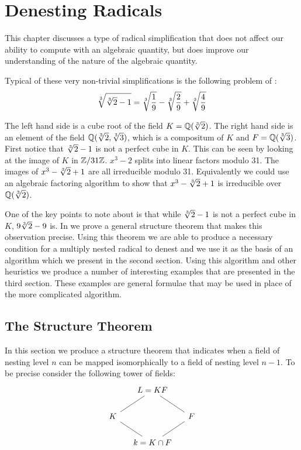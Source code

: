 \chapter{Denesting Radicals}
\label{Denesting:Chap}

This chapter discusses a type of radical simplification that does not
affect our ability to compute with an algebraic quantity, but does
improve our understanding of the nature of the algebraic quantity.

Typical of these very non-trivial simplifications is the following problem
of {\Ramanujan} \cite{Ramanujuan:Problems}:
\begin{equation}
\label{Cube:2:Radical:Eq}
\root 3 \of{\root 3 \of 2 -1} 
 = \root 3 \of {\frac{1}{9}} - 
   \root 3 \of {\frac{2}{9}} + 
   \root 3 \of {\frac{4}{9}}
\end{equation}

The left hand side is a cube root of the field $K = \Q(\root 3 \of 2)$.
The right hand side is an element of the field $\Q(\root 3 \of 2, \root 3
\of 3)$, which is a compositum of $K$ and $F = \Q(\root 3 \of 3)$.  First
notice that $\root 3 \of 2 - 1$ is not a perfect cube in $K$.  This can be
seen by looking at the image of $K$ in $\mathbb{Z}/31\mathbb{Z}$.  $x^3 - 2$ splits into
linear factors modulo 31.  The images of $x^3 - \root 3 \of 2 + 1$ are all
irreducible modulo 31.  Equivalently we could use an algebraic factoring
algorithm to show that $x^3 - \root 3 \of 2 + 1$ is irreducible over
$\Q(\root 3 \of 2)$.

One of the key points to note about  is that
while $\root 3 \of 2 - 1$ is not a perfect cube in $K$, $9 \root 3 \of 2 -
9$ is.  In  we prove a general structure
theorem that makes this observation precise.  Using this theorem we are
able to produce a necessary condition for a multiply nested radical to
denest and we use it as the basis of an algorithm which we present in the
second section.  Using this algorithm and other heuristics we produce a
number of interesting examples that are presented in the third section.
These examples are general formulae that may be used in place of the more
complicated algorithm.

\section{The Structure Theorem}
\label{Denesting:Structure:Sec}

In this section we produce a structure theorem that indicates 
when a field of nesting level $n$ can be mapped isomorphically to a field
of nesting level $n - 1$.  To be precise consider the following tower
of fields: 
\[
\begin{tikzcd}[column sep=small]
                            &L=KF \arrow[dash]{ld} \arrow[dash]{rd}  & \\
K \arrow[dash]{rd} & & F\arrow[dash]{ld} \\
& k= K\cap F & 
\end{tikzcd}
\]

